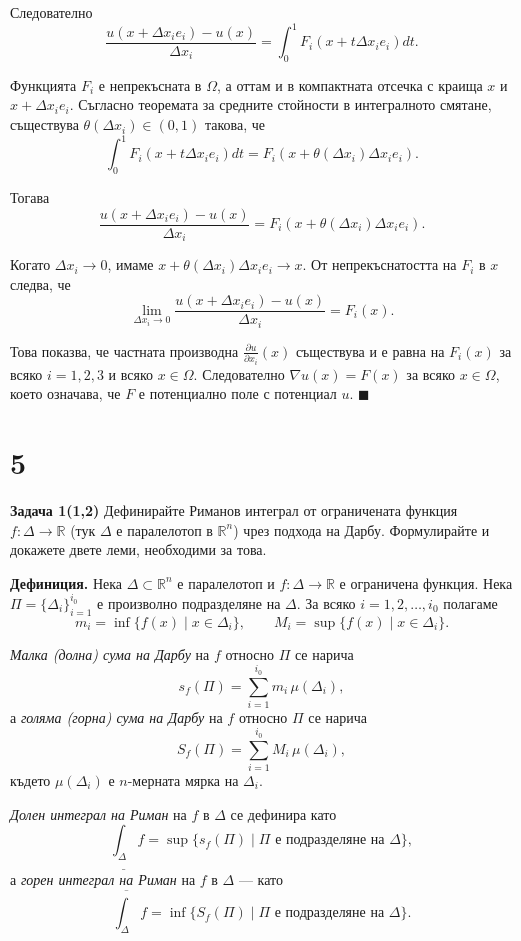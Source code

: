 \documentclass[10pt]{article}
\begin{document}
Следователно
\[
\frac{u(x+\Delta x_i e_i) - u(x)}{\Delta x_i} = \int_0^1 F_i(x + t\Delta x_i e_i) dt.
\]

Функцията $F_i$ е непрекъсната в $\Omega$, а оттам и в компактната отсечка с краища $x$ и $x+\Delta x_i e_i$. Съгласно теоремата за средните стойности в интегралното смятане, съществува $\theta(\Delta x_i) \in (0,1)$ такова, че
\[
\int_0^1 F_i(x + t\Delta x_i e_i) dt = F_i(x + \theta(\Delta x_i)\Delta x_i e_i).
\]

Тогава
\[
\frac{u(x+\Delta x_i e_i) - u(x)}{\Delta x_i} = F_i(x + \theta(\Delta x_i)\Delta x_i e_i).
\]

Когато $\Delta x_i \to 0$, имаме $x + \theta(\Delta x_i)\Delta x_i e_i \to x$. От непрекъснатостта на $F_i$ в $x$ следва, че
\[
\lim_{\Delta x_i \to 0} \frac{u(x+\Delta x_i e_i) - u(x)}{\Delta x_i} = F_i(x).
\]

Това показва, че частната производна $\frac{\partial u}{\partial x_i}(x)$ съществува и е равна на $F_i(x)$ за всяко $i = 1,2,3$ и всяко $x \in \Omega$. Следователно $\nabla u(x) = F(x)$ за всяко $x \in \Omega$, което означава, че $F$ е потенциално поле с потенциал $u$. $\blacksquare$


\section*{5}

\textbf{Задача 1(1,2) }Дефинирайте Риманов интеграл от ограничената функция $f : \Delta \to \mathbb{R}$ (тук $\Delta$ е паралелотоп в $\mathbb{R}^n$) чрез подхода на Дарбу. Формулирайте и докажете двете леми, необходими за това. 


\textbf{Дефиниция.} 
Нека $\Delta \subset \mathbb{R}^n$ е паралелотоп и $f : \Delta \to \mathbb{R}$ е ограничена функция. 
Нека $\Pi = \{\Delta_i\}_{i=1}^{i_0}$ е произволно подразделяне на $\Delta$. 
За всяко $i = 1,2,\dots,i_0$ полагаме
\[
m_i = \inf\{f(x) \mid x \in \Delta_i\}, \qquad 
M_i = \sup\{f(x) \mid x \in \Delta_i\}.
\]

\textit{Малка (долна) сума на Дарбу} на $f$ относно $\Pi$ се нарича
\[
s_f(\Pi) = \sum_{i=1}^{i_0} m_i \, \mu(\Delta_i),
\]
а \textit{голяма (горна) сума на Дарбу} на $f$ относно $\Pi$ се нарича
\[
S_f(\Pi) = \sum_{i=1}^{i_0} M_i \, \mu(\Delta_i),
\]
където $\mu(\Delta_i)$ е $n$-мерната мярка на $\Delta_i$.

\textit{Долен интеграл на Риман} на $f$ в $\Delta$ се дефинира като
\[
\underline{\int_{\Delta}} f = \sup\{ s_f(\Pi) \mid \Pi \text{ е подразделяне на } \Delta \},
\]
а \textit{горен интеграл на Риман} на $f$ в $\Delta$ — като
\[
\overline{\int_{\Delta}} f = \inf\{ S_f(\Pi) \mid \Pi \text{ е подразделяне на } \Delta \}.
\]
\end{document}

